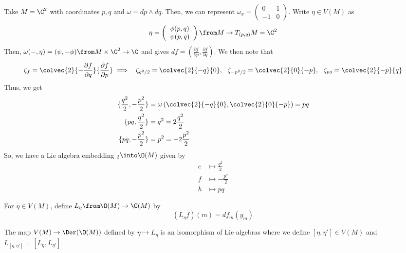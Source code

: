 \begin{example} \label{sl2-moment-map}
  Take \(M = \C^2\) with coordinates \(p,q\) and \(\omega = dp \wedge
  dq\). Then, we can represent \(\omega_x = \left(
    \begin{array}{cc}
      0&1\\
      -1&0
    \end{array}
  \right)\). Write \(\eta \in V(M)\) as \[
    \eta = \left(
      \begin{array}{c}
        \phi(p,q) \\
        \psi(p,q)
      \end{array}
    \right) \from M \to T_{(p,q)} M = \C^2
  \]
  Then, \(\omega(-,\eta) = (\psi, - \phi) \from M \times \C^2 \to \C\)
   and gives \(df =
  (\frac{\partial f}{\partial p}, \frac{\partial f}{\partial q})\). We
  then note that \[
    \zeta_f = \colvec{2}
        {- \frac{\partial f}{\partial q}}
       { \frac{\partial f}{\partial p}} \implies
       \ \ \zeta_{q^2/2} = \colvec{2}{-q}{0},
       \ \ \zeta_{-p^2/2} = \colvec{2}{0}{-p},
       \ \ \zeta_{pq} = \colvec{2}{-p}{q}
     \]
  Thus, we get
  \begin{align*}
    \{\frac{q^2}{2}, -\frac{p^2}{2}\}
    & = \omega\left(\colvec{2}{-q}{0}, \colvec{2}{0}{-p} \right) = pq \\
    \{pq, \frac{q^2}{2}\} & = q^2 = 2 \frac{q^2}{2} \\
    \{pq, -\frac{p^2}{2}\} & = p^2 = -2 \frac{p^2}{2}
  \end{align*}
  So, we have a Lie algebra embedding \(\sl_2 \into \O(M)\) given by
  \begin{align*}
    e & \mapsto \frac{q^2}{2} \\
    f & \mapsto -\frac{p^2}{2} \\
    h & \mapsto pq
  \end{align*}
\end{example}
\begin{defn}
  For \(\eta \in V(M)\), define \(L_\eta \from \O(M) \to \O(M)\) by \[
    (L_\eta f)(m) = df_m(y_m)
  \]
\end{defn}
\begin{prop}
  The map \(V(M) \to \Der(\O(M))\) defined by \(\eta \mapsto
  L_\eta\) is an isomorphism of Lie algebras where we define
  \([\eta,\eta'] \in V(M)\) and \(L_{[\eta,\eta']} = [L_\eta,
  L_{\eta'}]\). 
\end{prop}
